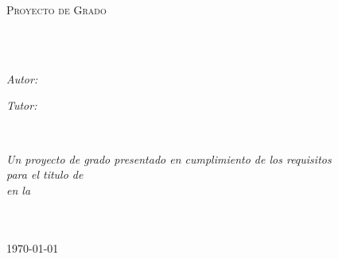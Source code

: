 \documentclass[11pt,spanish,singlespacing,headsepline]{MastersDoctoralThesis}
\author{Evelyn \textsc{Cusi López}}
\begin{document}
\frontmatter %

\pagestyle{plain} %
\begin{titlepage}
\begin{center}

\vspace*{.06\textheight}
{\scshape\LARGE \univname\par}\vspace{1.5cm} %
\textsc{\Large Proyecto de Grado}\\[0.5cm] %

\HRule \\[0.4cm] %
{\huge \bfseries \ttitle\par}\vspace{0.4cm} %
\HRule \\[1.5cm] %
 
\begin{minipage}[t]{0.4\textwidth}
\begin{flushleft} \large
\emph{Autor:}\\
{\authorname}
\end{flushleft}
\end{minipage}
\begin{minipage}[t]{0.4\textwidth}
\begin{flushright} \large
\emph{Tutor:} \\
{\supname}
\end{flushright}
\end{minipage}\\[3cm]

\vfill

\large \textit{Un proyecto de grado presentado en cumplimiento de los requisitos\\ para el titulo de \degreename}\\[0.3cm]
\textit{en la}\\[0.4cm]
\groupname\\\deptname\\[2cm]
\vfill

{\large \today}\\[4cm]
\vfill
\end{center}
\end{titlepage}
\end{document}
